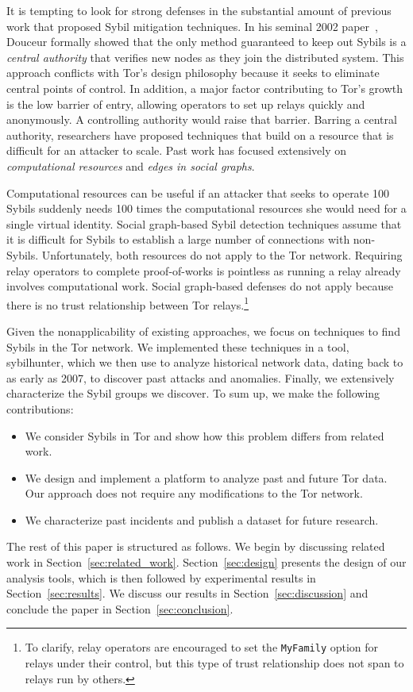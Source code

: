 It is tempting to look for strong defenses in the substantial amount of previous
work that proposed Sybil mitigation techniques.  In his seminal 2002
paper~\cite{Douceur2002a}, Douceur formally showed that the only method
guaranteed to keep out Sybils is a \emph{central authority} that verifies new
nodes as they join the distributed system.  This approach conflicts with Tor's
design philosophy because it seeks to eliminate central points of control.  In
addition, a major factor contributing to Tor's growth is the low barrier of
entry, allowing operators to set up relays quickly and anonymously.  A
controlling authority would raise that barrier.  Barring a central authority,
researchers have proposed techniques that build on a resource that is difficult
for an attacker to scale.  Past work has focused extensively on
\emph{computational resources} and \emph{edges in social graphs}.

Computational resources can be useful if an attacker that seeks to
operate 100 Sybils suddenly needs 100 times the computational resources she
would need for a single virtual identity.  Social graph-based Sybil detection
techniques assume that it is difficult for Sybils to establish a large number of
connections with non-Sybils.  Unfortunately, both resources do not apply to the
Tor network. Requiring relay operators to complete proof-of-works is pointless
as running a relay already involves computational work.  Social graph-based
defenses do not apply because there is no trust relationship between Tor
relays.\footnote{To clarify, relay operators are encouraged to set the
\texttt{MyFamily} option for relays under their control, but this type of
trust relationship does not span to relays run by others.}

Given the nonapplicability of existing approaches, we focus on techniques to
find Sybils in the Tor network.  We implemented these techniques in a tool,
sybilhunter, which we then use to analyze historical network data, dating back
to as early as 2007, to discover past attacks and anomalies.  Finally, we
extensively characterize the Sybil groups we discover.  To sum up, we make
the following contributions:
\begin{itemize}
	\item We consider Sybils in Tor and show how this problem differs from
		related work.
	\item We design and implement a platform to analyze past and future Tor
		data.  Our approach does not require any modifications to the Tor
		network.
	\item We characterize past incidents and publish a dataset for future
		research.
\end{itemize}

The rest of this paper is structured as follows.  We begin by discussing
related work in Section~\ref{sec:related_work}.  Section~\ref{sec:design}
presents the design of our analysis tools, which is then followed by
experimental results in Section~\ref{sec:results}.  We discuss our results in
Section~\ref{sec:discussion} and conclude the paper in
Section~\ref{sec:conclusion}.

